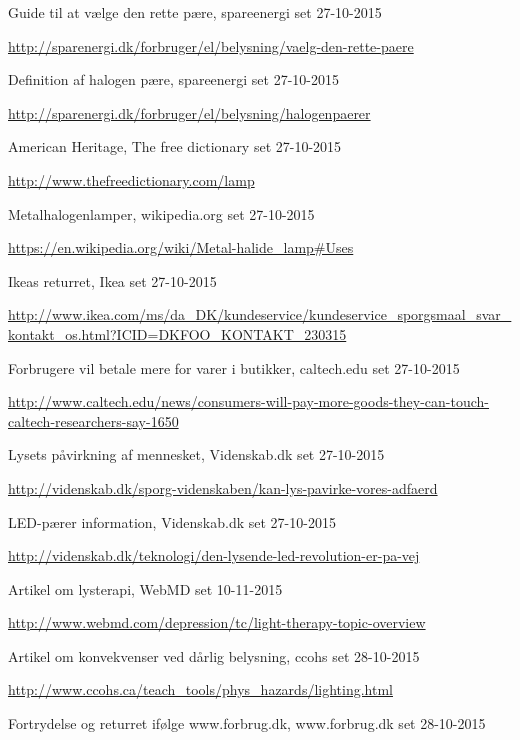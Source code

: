 \begin{thebibliography}{99}
  Guide til at vælge den rette pære,
  spareenergi
  set 27-10-2015
  
  \url{http://sparenergi.dk/forbruger/el/belysning/vaelg-den-rette-paere}

  Definition af halogen pære,
  spareenergi
  set 27-10-2015
  
  \url{http://sparenergi.dk/forbruger/el/belysning/halogenpaerer}

  American Heritage,
  The free dictionary
  set 27-10-2015
  
  \url{http://www.thefreedictionary.com/lamp}

  Metalhalogenlamper,
  wikipedia.org
  set 27-10-2015
  
  \url{https://en.wikipedia.org/wiki/Metal-halide_lamp#Uses}

  Ikeas returret,
  Ikea
  set 27-10-2015
  
  \url{http://www.ikea.com/ms/da_DK/kundeservice/kundeservice_sporgsmaal_svar_kontakt_os.html?ICID=DKFOO_KONTAKT_230315}


  Forbrugere vil betale mere for varer i butikker,
  caltech.edu
  set 27-10-2015
  
  \url{http://www.caltech.edu/news/consumers-will-pay-more-goods-they-can-touch-caltech-researchers-say-1650}

  Lysets påvirkning af mennesket,
  Videnskab.dk
  set 27-10-2015
  
  \url{http://videnskab.dk/sporg-videnskaben/kan-lys-pavirke-vores-adfaerd}

  LED-pærer information,
  Videnskab.dk
  set 27-10-2015
  
  \url{http://videnskab.dk/teknologi/den-lysende-led-revolution-er-pa-vej}

  Artikel om lysterapi,
  WebMD
  set 10-11-2015
  
  \url{http://www.webmd.com/depression/tc/light-therapy-topic-overview}

  Artikel om konvekvenser ved dårlig belysning,
  ccohs
  set 28-10-2015
  
  \url{http://www.ccohs.ca/teach_tools/phys_hazards/lighting.html}
  
  Fortrydelse og returret ifølge www.forbrug.dk,
  www.forbrug.dk
  set 28-10-2015
  

\end{thebibliography}
